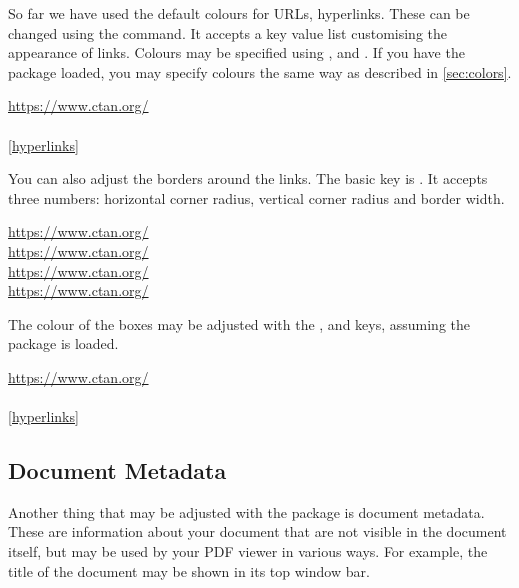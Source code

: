 So far we have used the default colours for URLs, hyperlinks. These can be
changed using the  command. It accepts a key value list
customising the appearance of links. Colours may be specified using
,  and . If you have the
 package loaded, you may specify colours the same way as described
in \autoref{sec:colors}.
\begin{chktexignore}
\begin{example}
\hypersetup{
  urlcolor = pink,
  citecolor = purple,
  linkcolor = teal!50!yellow,
}
\url{https://www.ctan.org/} \\
\cite{pack:hyperref} \\
\autoref{hyperlinks}
\end{example}
\end{chktexignore}

You can also adjust the borders around the links. The basic key is
. It accepts three numbers: horizontal corner radius, vertical
corner radius and border width.
\begin{example}
\hypersetup{pdfborder = 0 0 1}
\url{https://www.ctan.org/} \\
\hypersetup{pdfborder = 10 10 3}
\url{https://www.ctan.org/} \\
\hypersetup{pdfborder = 10 5 2}
\url{https://www.ctan.org/} \\
\hypersetup{pdfborder = 2 7 5}
\url{https://www.ctan.org/}
\end{example}
The colour of the boxes may be adjusted with the
,  and 
keys, assuming the  package is loaded.
\begin{chktexignore}
  \begin{example}
\hypersetup{
  pdfborder = 0 0 2,
  urlbordercolor = violet,
  citebordercolor = pink,
  linkbordercolor = teal,
}
\url{https://www.ctan.org/} \\
\cite{pack:hyperref} \\
\autoref{hyperlinks}
\end{example}
\end{chktexignore}

\subsection{Document Metadata}\label{sec:pdfmeta}

Another thing that may be adjusted with the  package is document
metadata. These are information about your document that are not visible in the
document itself, but may be used by your PDF viewer in various ways. For
example, the title of the document may be shown in its top window bar.

